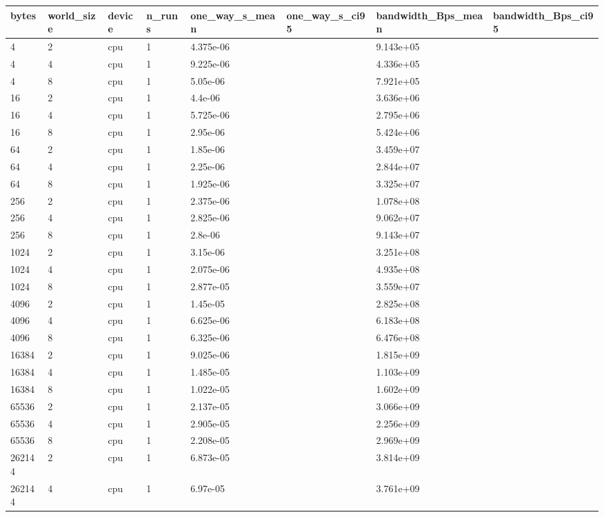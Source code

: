 \begin{tabular}{llllllll}
\hline
bytes & world\_size & device & n\_runs & one\_way\_s\_mean & one\_way\_s\_ci95 & bandwidth\_Bps\_mean & bandwidth\_Bps\_ci95 \\
\hline
4 & 2 & cpu & 1 & 4.375e-06 &  & 9.143e+05 &  \\
4 & 4 & cpu & 1 & 9.225e-06 &  & 4.336e+05 &  \\
4 & 8 & cpu & 1 & 5.05e-06 &  & 7.921e+05 &  \\
16 & 2 & cpu & 1 & 4.4e-06 &  & 3.636e+06 &  \\
16 & 4 & cpu & 1 & 5.725e-06 &  & 2.795e+06 &  \\
16 & 8 & cpu & 1 & 2.95e-06 &  & 5.424e+06 &  \\
64 & 2 & cpu & 1 & 1.85e-06 &  & 3.459e+07 &  \\
64 & 4 & cpu & 1 & 2.25e-06 &  & 2.844e+07 &  \\
64 & 8 & cpu & 1 & 1.925e-06 &  & 3.325e+07 &  \\
256 & 2 & cpu & 1 & 2.375e-06 &  & 1.078e+08 &  \\
256 & 4 & cpu & 1 & 2.825e-06 &  & 9.062e+07 &  \\
256 & 8 & cpu & 1 & 2.8e-06 &  & 9.143e+07 &  \\
1024 & 2 & cpu & 1 & 3.15e-06 &  & 3.251e+08 &  \\
1024 & 4 & cpu & 1 & 2.075e-06 &  & 4.935e+08 &  \\
1024 & 8 & cpu & 1 & 2.877e-05 &  & 3.559e+07 &  \\
4096 & 2 & cpu & 1 & 1.45e-05 &  & 2.825e+08 &  \\
4096 & 4 & cpu & 1 & 6.625e-06 &  & 6.183e+08 &  \\
4096 & 8 & cpu & 1 & 6.325e-06 &  & 6.476e+08 &  \\
16384 & 2 & cpu & 1 & 9.025e-06 &  & 1.815e+09 &  \\
16384 & 4 & cpu & 1 & 1.485e-05 &  & 1.103e+09 &  \\
16384 & 8 & cpu & 1 & 1.022e-05 &  & 1.602e+09 &  \\
65536 & 2 & cpu & 1 & 2.137e-05 &  & 3.066e+09 &  \\
65536 & 4 & cpu & 1 & 2.905e-05 &  & 2.256e+09 &  \\
65536 & 8 & cpu & 1 & 2.208e-05 &  & 2.969e+09 &  \\
262144 & 2 & cpu & 1 & 6.873e-05 &  & 3.814e+09 &  \\
262144 & 4 & cpu & 1 & 6.97e-05 &  & 3.761e+09 &  \\

\end{tabular}
